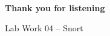 \begin{frame}[plain]
  \centering
  \vfill
  {\fontsize{34}{40}\selectfont\bfseries Thank you for listening\par}
  \vspace{0.5cm}
  {\fontsize{18}{22}\selectfont Lab Work 04 -- Snort\par}
  \vfill
\end{frame}
